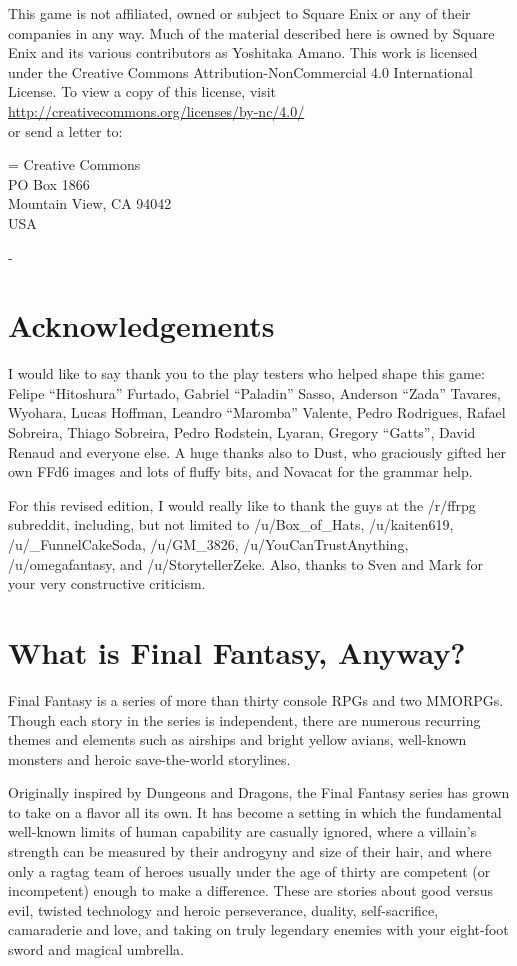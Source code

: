 \begin{multicols}{2}
This game is not affiliated, owned or subject to Square Enix or any of their companies in any way. Much of the material described here is owned by Square Enix and its various contributors as Yoshitaka Amano. This work is licensed under the Creative Commons Attribution-NonCommercial 4.0 International License. To view a copy of this license, visit\\
\url{http://creativecommons.org/licenses/by-nc/4.0/}\\
or send a letter to:

\hangindent=\parindent
Creative Commons\\
PO Box 1866\\
Mountain View, CA 94042\\
USA


- \ferrum
\end{multicols}
\newpage

\begin{multicols}{2}
\section*{Acknowledgements}
\label{sec:acknowledgements}
I would like to say thank you to the play testers who helped shape this game: Felipe ``Hitoshura'' Furtado, Gabriel ``Paladin'' Sasso, Anderson ``Zada'' Tavares, Wyohara, Lucas Hoffman, Leandro ``Maromba'' Valente, Pedro Rodrigues, Rafael Sobreira, Thiago Sobreira, Pedro Rodstein, Lyaran, Gregory ``Gatts'', David Renaud and everyone else. A huge thanks also to Dust, who graciously gifted her own FFd6 images and lots of fluffy bits, and Novacat for the grammar
help. \pw

For this revised edition, I would really like to thank the guys at the /r/ffrpg subreddit, including, but not limited to /u/Box\_of\_Hats, /u/kaiten619, /u/\_FunnelCakeSoda, /u/GM\_3826, /u/YouCanTrustAnything, /u/omegafantasy, and /u/StorytellerZeke. Also, thanks to Sven and Mark for your very constructive criticism.

\section*{What is Final Fantasy, Anyway?}
\label{sec:whatff}
Final Fantasy is a series of more than thirty console RPGs and two MMORPGs. Though each story in the series is independent, there are numerous recurring themes and elements such as airships and bright yellow avians, well-known monsters and heroic save-the-world storylines.

Originally inspired by Dungeons and Dragons, the Final Fantasy series has grown to take on a flavor all its own. It has become a setting in which the fundamental well-known limits of human capability are casually ignored, where a villain’s strength can be measured by their androgyny and size of their hair, and where only a ragtag team of heroes usually under the age of thirty are competent (or incompetent) enough to make a difference. These are stories about good versus evil, twisted technology and heroic perseverance, duality, self-sacrifice, camaraderie and love, and taking on truly legendary enemies with your eight-foot sword and magical umbrella.
\end{multicols}